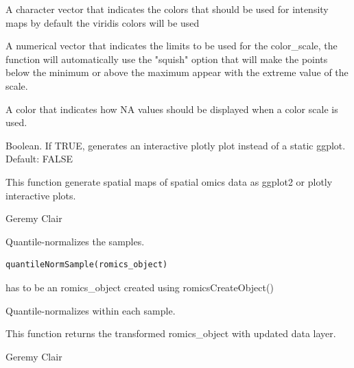 \documentclass[a4paper]{book}
\begin{document}
\begin{Arguments}
\begin{ldescription}
\item[\code{scale\_colors}] A character vector that indicates the colors that should be used for intensity maps by default the viridis colors will be used

\item[\code{scale\_limits}] A numerical vector that indicates the limits to be used for the color\_scale, the function will automatically use the "squish" option that will make the points below the minimum or above the maximum appear with the extreme value of the scale.

\item[\code{na\_value}] A color that indicates how NA values should be displayed when a color scale is used.

\item[\code{plotly}] Boolean. If TRUE, generates an interactive plotly plot instead of a static ggplot. Default: FALSE
\end{ldescription}
\end{Arguments}
%
\begin{Value}
This function generate spatial maps of spatial omics data as ggplot2 or plotly interactive plots.
\end{Value}
%
\begin{Author}
Geremy Clair
\end{Author}
%
\begin{Description}
Quantile-normalizes the samples.
\end{Description}
%
\begin{Usage}
\begin{verbatim}
quantileNormSample(romics_object)
\end{verbatim}
\end{Usage}
%
\begin{Arguments}
\begin{ldescription}
\item[\code{romics\_object}] has to be an romics\_object created using romicsCreateObject()
\end{ldescription}
\end{Arguments}
%
\begin{Details}
Quantile-normalizes within each sample.
\end{Details}
%
\begin{Value}
This function returns the transformed romics\_object with updated data layer.
\end{Value}
%
\begin{Author}
Geremy Clair
\end{Author}
\end{document}
